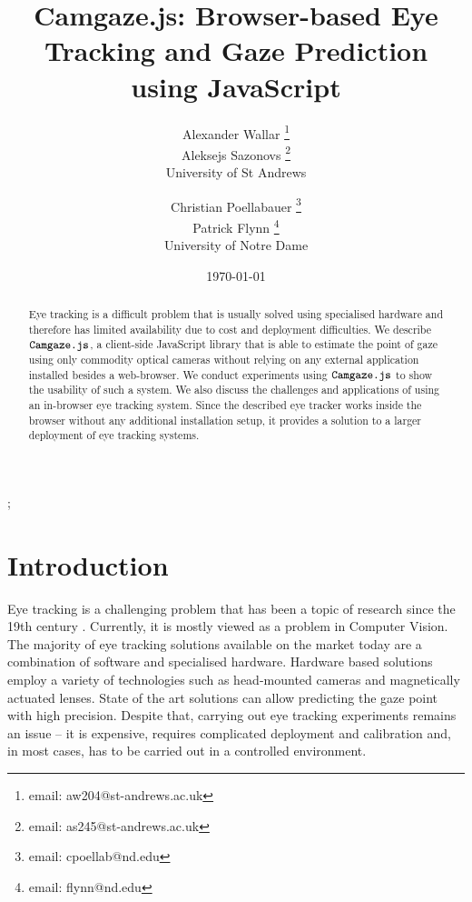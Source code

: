 \documentclass[annual]{acmsiggraph}
\title{Camgaze.js: Browser-based Eye Tracking and Gaze Prediction using
JavaScript}
\author{Alexander Wallar \thanks{email: aw204@st-andrews.ac.uk} \\ Aleksejs
Sazonovs \thanks{email: as245@st-andrews.ac.uk} \\ University of St Andrews
\and Christian Poellabauer \thanks{email: cpoellab@nd.edu} \\ Patrick Flynn
\thanks{email: flynn@nd.edu} \\ University of Notre Dame}
\date{\today}
\newcommand{\Acronym}[1]{\ensuremath{{\small{\texttt{#1}}}}}
\newcommand{\Name}{\Acronym{Camgaze.js}} \newcommand{\False}{\Constant{false}}
\newcommand{\Constant}[1]{\ensuremath{\small{\texttt{#1}}}}
\begin{document}
\maketitle

\begin{abstract}

Eye tracking is a difficult problem that is usually solved using specialised
hardware and therefore has limited availability due to cost and deployment
difficulties. We describe $\Name$, a client-side JavaScript library that is
able to estimate the point of gaze using only commodity optical cameras without
relying on any external application installed besides a web-browser. We conduct
experiments using $\Name$ to show the usability of such a system.  We also
discuss the challenges and applications of using an in-browser eye tracking
system. Since the described eye tracker works inside the browser without any
additional installation setup, it provides a solution to a larger deployment of
eye tracking systems.

\end{abstract}

\begin{CRcatlist} ;

\end{CRcatlist}

\keywordlist


\copyrightspace

\section{Introduction}

Eye tracking is a challenging problem that has been a topic of research
since the 19th century \cite{Wade2010}. Currently, it is mostly viewed as a
problem in Computer Vision. The majority of eye tracking solutions available on
the market today are a combination of software and specialised hardware.
Hardware based solutions employ a variety of technologies such as head-mounted
cameras and magnetically actuated lenses. State of the art solutions can allow
predicting the gaze point with high precision.  Despite that, carrying out eye
tracking experiments remains an issue -- it is expensive, requires complicated
deployment and calibration and, in most cases, has to be carried out in a
controlled environment.
\end{document}
